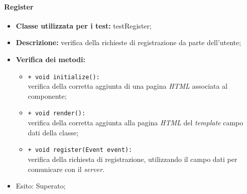 \paragraph{Register}
\begin{flushleft}
\begin{itemize}
\item \textbf{Classe utilizzata per i test:} testRegister;
\item \textbf{Descrizione:} verifica della richieste di registrazione da parte dell'utente;
\item \textbf{Verifica dei metodi:}
\begin{sloppypar}
\begin{itemize}
\item \texttt{+ void initialize():}\\ verifica della corretta aggiunta di una pagina \textit{HTML} associata al componente;
\item \texttt{+ void render():}\\ verifica della corretta aggiunta alla pagina \textit{HTML} del \textit{template} campo dati della classe;
\item \texttt{+ void register(Event event):}\\ verifica della richiesta di registrazione, utilizzando il campo dati \model{} per comunicare con il \textit{server}.
\end{itemize}
\end{sloppypar}
\item Esito: Superato;
\end{itemize}
\end{flushleft}

